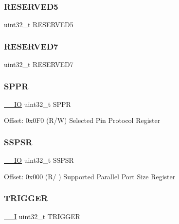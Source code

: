 \subsubsection{\texorpdfstring{RESERVED5}{RESERVED5}}
{\footnotesize\ttfamily uint32\+\_\+t R\+E\+S\+E\+R\+V\+E\+D5}

\mbox{\label{struct_t_p_i___type_a7055d97dce64c27cd79d6672bd41db21}} 
\subsubsection{\texorpdfstring{RESERVED7}{RESERVED7}}
{\footnotesize\ttfamily uint32\+\_\+t R\+E\+S\+E\+R\+V\+E\+D7}

\mbox{\label{struct_t_p_i___type_a102814b254904beb9060757a93fe526c}} 
\subsubsection{\texorpdfstring{SPPR}{SPPR}}
{\footnotesize\ttfamily \mbox{\hyperlink{core__sc300_8h_aec43007d9998a0a0e01faede4133d6be}{\+\_\+\+\_\+\+IO}} uint32\+\_\+t S\+P\+PR}

Offset\+: 0x0\+F0 (R/W) Selected Pin Protocol Register \mbox{\label{struct_t_p_i___type_ad6abd8c7878d64e5e8e442de842f9de8}} 
\subsubsection{\texorpdfstring{SSPSR}{SSPSR}}
{\footnotesize\ttfamily \mbox{\hyperlink{core__sc300_8h_aec43007d9998a0a0e01faede4133d6be}{\+\_\+\+\_\+\+IO}} uint32\+\_\+t S\+S\+P\+SR}

Offset\+: 0x000 (R/ ) Supported Parallel Port Size Register \mbox{\label{struct_t_p_i___type_aa3adfea70bff38242f8231737a7fa2dd}} 
\subsubsection{\texorpdfstring{TRIGGER}{TRIGGER}}
{\footnotesize\ttfamily \mbox{\hyperlink{core__sc300_8h_af63697ed9952cc71e1225efe205f6cd3}{\+\_\+\+\_\+I}} uint32\+\_\+t T\+R\+I\+G\+G\+ER}

